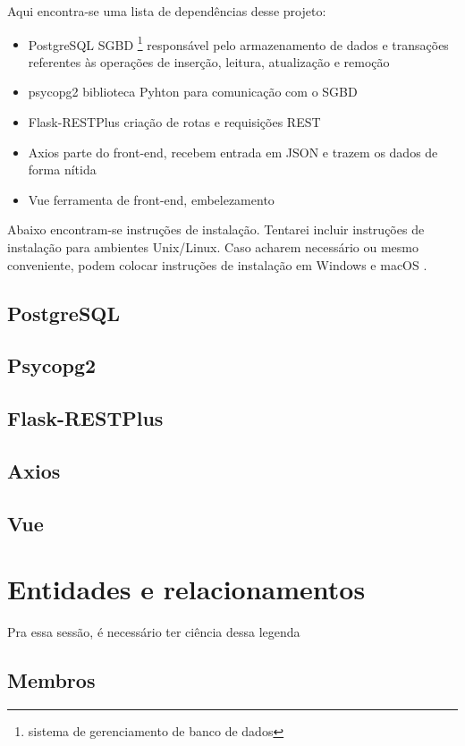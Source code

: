 \documentclass{article}
\newcommand{\codigo}[3]{}
\begin{document}
    Aqui encontra-se uma lista de dependências desse projeto:
    \begin{itemize}
        \item PostgreSQL \dir SGBD \footnote{sistema de gerenciamento de banco de dados}
        responsável pelo armazenamento de dados e transações referentes às operações de
        inserção, leitura, atualização e remoção
        \item psycopg2 \dir biblioteca Pyhton para comunicação com o SGBD
        \item Flask-RESTPlus \dir criação de rotas e requisições REST
        \item Axios \dir parte do front-end, recebem entrada em JSON e trazem os dados de
        forma nítida
        \item Vue \dir ferramenta de front-end, embelezamento
    \end{itemize}
    Abaixo encontram-se instruções de instalação. Tentarei incluir instruções de instalação
    para ambientes Unix/Linux. Caso acharem necessário ou mesmo conveniente, podem colocar
    instruções de instalação em Windows e macOS .

        \subsection{PostgreSQL}
        \subsection{Psycopg2}
        \subsection{Flask-RESTPlus}
        \subsection{Axios}
        \subsection{Vue}

    \section[Descrição]{Entidades e relacionamentos}

        Pra essa sessão, é necessário ter ciência dessa legenda
        \legenda

        \subsection{Membros}
            \codigo{3}{17}{Membros}
\end{document}
